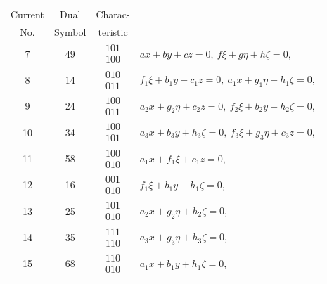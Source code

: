 \documentclass[11pt,a4paper]{article}
\begin{document}
\thispagestyle{plain}
\begin{center}
\small
\begin{tabular}{|c|c|c|l|}
\hline
Current & Dual & Charac- & \\
No. & Symbol & teristic & \\\hline
7  & 49 & $\begin{array}{c}101\\100\end{array}$ & $ax + by + cz = 0,\ f\xi + g\eta + h\zeta = 0,$ \\\hline
8  & 14 & $\begin{array}{c}010\\011\end{array}$ & $f_{1}\xi + b_{1}y + c_{1}z = 0,\ a_{1}x + g_{1}\eta + h_{1}\zeta = 0,$ \\\hline
9  & 24 & $\begin{array}{c}100\\011\end{array}$ & $a_{2}x + g_{2}\eta + c_{2}z = 0,\ f_{2}\xi + b_{2}y + h_{2}\zeta = 0,$ \\\hline
10 & 34 & $\begin{array}{c}100\\101\end{array}$ & $a_{3}x + b_{3}y + h_{3}\zeta = 0,\ f_{3}\xi + g_{3}\eta + c_{3}z = 0,$ \\\hline
11 & 58 & $\begin{array}{c}100\\010\end{array}$ & $a_{1}x + f_{1}\xi + c_{1}z = 0,$ \\\hline
12 & 16 & $\begin{array}{c}001\\010\end{array}$ & $f_{1}\xi + b_{1}y + h_{1}\zeta = 0,$ \\\hline
13 & 25 & $\begin{array}{c}101\\010\end{array}$ & $a_{2}x + g_{2}\eta + h_{2}\zeta = 0,$ \\\hline
14 & 35 & $\begin{array}{c}111\\110\end{array}$ & $a_{3}x + g_{3}\eta + h_{3}\zeta = 0,$ \\\hline
15 & 68 & $\begin{array}{c}110\\010\end{array}$ & $a_{1}x + b_{1}y + h_{1}\zeta = 0,$ \\\hline

\end{tabular}
\end{center}
\end{document}
